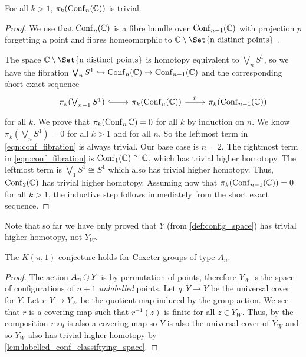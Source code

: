 \documentclass[class=article, crop=false]{standalone}
\begin{document}
\begin{lemma}
	For all $k>1$, $\pi_k(\operatorname{Conf}_n(\mathbb{C}))$ is trivial.
	\label{lem:labelled_conf_classiftying_space}
\end{lemma}
\begin{proof}
	We use that $\operatorname{Conf}_n(\mathbb{C})$ is a fibre bundle over $\operatorname{Conf}_{n-1}(\mathbb{C})$ with projection $p$ forgetting a point and fibres homeomorphic to $\C \setminus \Set{\text{n distinct points}}$ \cite[Theorem 3]{fadell_neuwirth_configuration_1962}.

The space $\C \setminus \Set{\text{n distinct points}}$ is homotopy equivalent to $\bigvee_n S^1$, so we have the fibration $\bigvee_n S^1 \hookrightarrow \operatorname{Conf}_n(\mathbb{C}) \to \operatorname{Conf}_{n-1}(\mathbb{C})$ and the corresponding short exact sequence
\begin{equation}
	\begin{tikzcd}
		&\pi_k(\bigvee_{n-1} S^1) \arrow[hook]{r} &\pi_k(\conf_n(\C)) \arrow{r}{p} &\pi_k(\conf_{n-1}(\C))
	\end{tikzcd}
	\label{eqn:conf_fibration}
\end{equation}
for all $k$.
We prove that $\pi_k(\operatorname{Conf}_n{\mathbb{C}})=0$ for all $k$ by induction on $n$. We know $\pi_k(\bigvee_nS^1)=0$ for all $k>1$ and for all $n$. So the leftmost term in \eqref{eqn:conf_fibration} is always trivial. Our base case is $n=2$. The rightmost term in \eqref{eqn:conf_fibration} is $\operatorname{Conf}_1(\mathbb{C}) \cong \mathbb{C}$, which has trivial higher homotopy. The leftmost term is $\bigvee_1 S^1 \cong S^1$ which also has trivial higher homotopy. Thus, $\operatorname{Conf}_2(\mathbb{C})$ has trivial higher homotopy. Assuming now that $\pi_k(\operatorname{Conf}_{n-1}(\mathbb{C})) = 0$ for all $k>1$, the inductive step follows immediately from the short exact sequence.
\end{proof}

Note that so far we have only proved that $Y$ (from \cref{def:config_space}) has trivial higher homotopy, not $Y_W$.

\begin{theorem}
	The $K(\pi,1)$ conjecture holds for Coxeter groups of type $A_n$.
\end{theorem}
\begin{proof}
	The action $A_n \acts Y$ is by permutation of points, therefore $Y_W$ is the space of configurations of $n+1$ \emph{unlabelled} points. Let $q \colon \widetilde{Y} \to Y$ be the universal cover for $Y$. Let $r \colon Y \to Y_W$ be the quotient map induced by the group action. We see that $r$ is a covering map such that $r^{-1}(z)$ is finite for all $z \in Y_W$. Thus, by \cite[Exercise 53.4]{munkres_topology_2000}
	the composition $r \circ q$ is also a covering map so $\widetilde{Y}$ is also the universal cover of $Y_W$ and so $Y_W$ also has trivial higher homotopy by \cref{lem:labelled_conf_classiftying_space}.
\end{proof}
\end{document}
